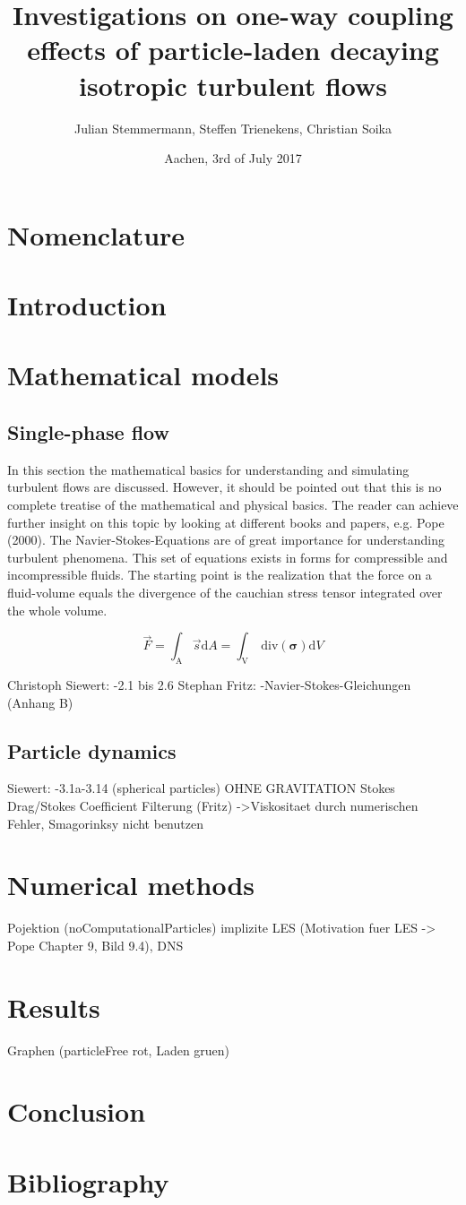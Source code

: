 \documentclass[a4paper,10pt]{article}
\title{Investigations on one-way coupling effects of particle-laden decaying isotropic turbulent flows}
\author{Julian Stemmermann, Steffen Trienekens, Christian Soika}
\date{Aachen, 3rd of July 2017}
\begin{document}
\maketitle

\pagebreak

\tableofcontents{}
 
\pagebreak

\section{Nomenclature}
\makenomenclature
\printnomenclature
\pagebreak

\section{Introduction}
\pagebreak
\section{Mathematical models}
\subsection{Single-phase flow} %
In this section the mathematical basics for understanding and simulating turbulent flows are discussed. However, it should be pointed out that this is no
complete treatise of the mathematical and physical basics. The reader can achieve further insight on this topic by looking at different books and papers, 
e.g. Pope (2000).
\newline
The Navier-Stokes-Equations are of great importance for understanding turbulent phenomena. This set of equations exists in forms for compressible and
incompressible fluids. The starting point is the realization that the force on a fluid-volume equals the divergence of the cauchian stress tensor
integrated over the whole volume.

\begin{equation}
  \vec F = \int_{\mathrm{A}}\vec s\mathrm{d}A = \int_{\mathrm{V}}\ \mathrm{div}(\bm{\sigma})\mathrm{d}V
\end{equation}


Christoph Siewert:
-2.1 bis 2.6
Stephan Fritz:
-Navier-Stokes-Gleichungen (Anhang B)
\pagebreak
\subsection{Particle dynamics} %
Siewert:
-3.1a-3.14 (spherical particles) OHNE GRAVITATION
Stokes Drag/Stokes Coefficient
Filterung (Fritz) ->Viskositaet durch numerischen Fehler, Smagorinksy nicht benutzen
\pagebreak
\section{Numerical methods} %
Pojektion (noComputationalParticles)
implizite LES (Motivation fuer LES -> Pope Chapter 9, Bild 9.4), DNS
\pagebreak
\section{Results}
Graphen (particleFree rot, Laden gruen)
\pagebreak
\section{Conclusion}
\pagebreak
\section{Bibliography}
\pagebreak
\end{document}
